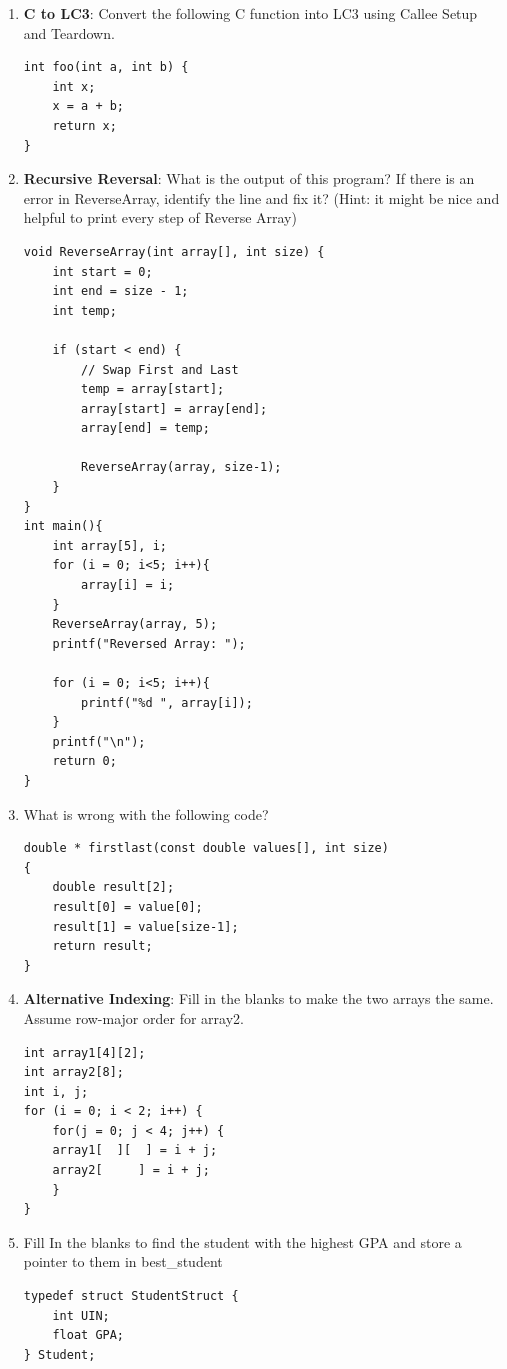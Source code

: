 \documentclass{article}
\begin{document}
\begin{enumerate}[label=(\alph*), itemsep = 120pt]
    \item \textbf{C to LC3}: Convert the following C function into LC3 using Callee Setup and Teardown.
    \begin{lstlisting}[style=CStyle] 
int foo(int a, int b) {
    int x;
    x = a + b;
    return x;
}\end{lstlisting}
    \newpage
    \item \textbf{Recursive Reversal}: What is the output of this program? If there is an error in ReverseArray, identify the line and fix it? (Hint: it might be nice and helpful to print every step of Reverse Array)
    
\begin{lstlisting}[style=CStyle] 
void ReverseArray(int array[], int size) {
    int start = 0;
    int end = size - 1;
    int temp;
    
    if (start < end) {
        // Swap First and Last
        temp = array[start];
        array[start] = array[end];
        array[end] = temp;
        
        ReverseArray(array, size-1);
    }
}
int main(){
    int array[5], i;
    for (i = 0; i<5; i++){
        array[i] = i;
    }
    ReverseArray(array, 5);
    printf("Reversed Array: ");

    for (i = 0; i<5; i++){
        printf("%d ", array[i]);
    }
    printf("\n");
    return 0;
}\end{lstlisting}

\item \textbf{}What is wrong with the following code? 
\begin{lstlisting}[style=CStyle] 
double * firstlast(const double values[], int size)
{
    double result[2];
    result[0] = value[0];
    result[1] = value[size-1];
    return result;
}
\end{lstlisting}

\item \textbf{Alternative Indexing}: Fill in the blanks to make the two arrays the same. Assume row-major order for array2.
\begin{lstlisting}[style=CStyle] 
int array1[4][2];
int array2[8];
int i, j;
for (i = 0; i < 2; i++) {
    for(j = 0; j < 4; j++) {
    array1[  ][  ] = i + j;
    array2[     ] = i + j;
    }
}
\end{lstlisting}

\item Fill In the blanks to find the student with the highest GPA and store a pointer to them in best\_student
\begin{lstlisting}[style=CStyle] 
typedef struct StudentStruct {
    int UIN;
    float GPA;
} Student;


\end{lstlisting}
\end{enumerate}
\end{document}
